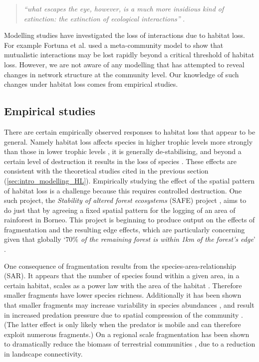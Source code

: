 \begin{quote}
 \emph{``what escapes the eye, however, is a much more insidious kind of extinction: the extinction of ecological interactions''} \cite{janzen1974}.
\end{quote}
%
Modelling studies have investigated the loss of interactions due to habitat loss. For example Fortuna et al. \cite{fortuna2013habitat} used a meta-community model to show that mutualistic interactions may be lost rapidly beyond a critical threshold of habitat loss. However, we are not aware of any modelling that has attempted to reveal changes in network structure at the community level. Our knowledge of such changes under habitat loss comes from empirical studies.



\subsection{Empirical studies}
\label{sec:intro_empirical_HL}

There are certain empirically observed responses to habitat loss that appear to be general. Namely habitat loss affects species in higher trophic levels more strongly than those in lower trophic levels \cite{duffy2003biodiversity,raffaelli2004extinction}, it is generally de-stabilising, and beyond a certain level of destruction it results in the loss of species \cite{gonzalez2011disentangled}. These effects are consistent with the theoretical studies cited in the previous section (\ref{sec:intro_modelling_HL}). Empirically studying the effect of the spatial pattern of habitat loss is a challenge because this requires controlled destruction. One such project, the \emph{Stability of altered forest ecosystems} (SAFE) project \cite{ewers2011large}, aims to do just that by agreeing a fixed spatial pattern for the logging of an area of rainforest in Borneo. This project is beginning to produce output on the effects of fragmentation and the resulting edge effects, which are particularly concerning given that globally `\emph{$70\%$ of the remaining forest is within 1km of the forest's edge}' \cite{haddad2015habitat}. 

One consequence of fragmentation results from the species-area-relationship (SAR). It appears that the number of species found within a given area, in a certain habitat, scales as a power law with the area of the habitat \cite{rosenzweig1995species}. Therefore smaller fragments have lower species richness. Additionally it has been shown that smaller fragments may increase variability	in species abundances \cite{wang2014ecosystem,ewers2006continuous}, and result in increased predation pressure due to spatial compression of the community \cite{gonzalez2011disentangled}. (The latter effect is only likely when the predator is mobile and can therefore exploit numerous fragments.) On a regional scale fragmentation has been shown to dramatically reduce the biomass of terrestrial communities \cite{haddad2015habitat}, due to a reduction in landscape connectivity.

